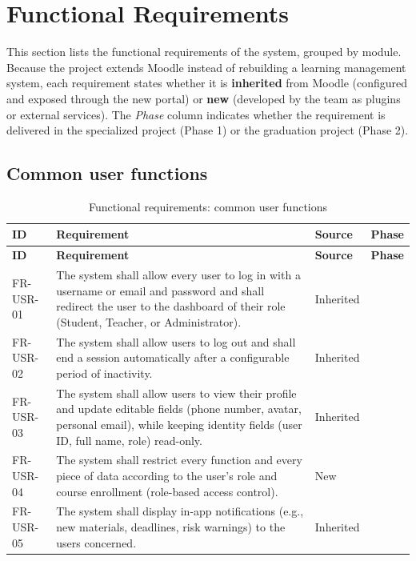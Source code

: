 \section{Functional Requirements}

This section lists the functional requirements of the system, grouped by module. Because the project extends Moodle instead of rebuilding a learning management system, each requirement states whether it is \textbf{inherited} from Moodle (configured and exposed through the new portal) or \textbf{new} (developed by the team as plugins or external services). The \textit{Phase} column indicates whether the requirement is delivered in the specialized project (Phase 1) or the graduation project (Phase 2).


\newcommand{\frtablehead}{%
\hline
\textbf{ID} & \textbf{Requirement} & \textbf{Source} & \textbf{Phase} \\ \hline}

\newenvironment{frtable}[2]{%
\small\renewcommand{\arraystretch}{1.15}
\begin{longtable}{|>{\raggedright\arraybackslash}p{0.15\textwidth}|>{\raggedright\arraybackslash}p{0.5\textwidth}|>{\centering\arraybackslash}p{0.12\textwidth}|>{\centering\arraybackslash}p{0.08\textwidth}|}
\caption{#1}\label{#2}\\
\frtablehead
\endfirsthead
\frtablehead
\endhead
}{%
\end{longtable}}

\subsection{Common user functions}
\begin{frtable}{Functional requirements: common user functions}{tab:fr-user}
FR-USR-01 & The system shall allow every user to log in with a username or email and password and shall redirect the user to the dashboard of their role (Student, Teacher, or Administrator). & Inherited & 1 \\ \hline
FR-USR-02 & The system shall allow users to log out and shall end a session automatically after a configurable period of inactivity. & Inherited & 1 \\ \hline
FR-USR-03 & The system shall allow users to view their profile and update editable fields (phone number, avatar, personal email), while keeping identity fields (user ID, full name, role) read-only. & Inherited & 1 \\ \hline
FR-USR-04 & The system shall restrict every function and every piece of data according to the user's role and course enrollment (role-based access control). & New & 1 \\ \hline
FR-USR-05 & The system shall display in-app notifications (e.g., new materials, deadlines, risk warnings) to the users concerned. & Inherited & 1 \\ \hline
\end{frtable}

